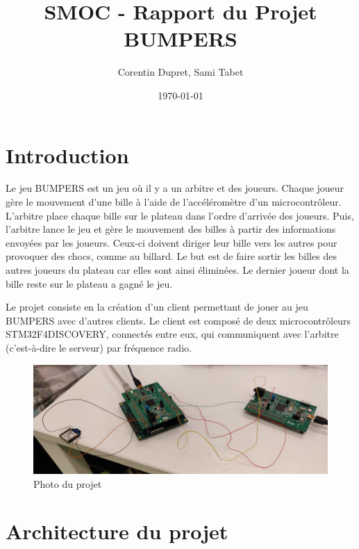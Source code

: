 \documentclass[12pt,french]{article}
\title{SMOC - Rapport du Projet BUMPERS}
\author{Corentin Dupret, Sami Tabet}
\date{\today}
\begin{document}
\maketitle

\newpage

\tableofcontents

\newpage

\section{Introduction}

Le jeu BUMPERS est un jeu où il y a un arbitre et des joueurs. Chaque joueur gère le mouvement d'une bille à l'aide de l'accéléromètre d'un microcontrôleur. L'arbitre place chaque bille sur le plateau dans l'ordre d'arrivée des joueurs. Puis, l'arbitre lance le jeu et gère le mouvement des billes à partir des informations envoyées par les joueurs. Ceux-ci doivent diriger leur bille vers les autres pour provoquer des chocs, comme au billard. Le but est de faire sortir les billes des autres joueurs du plateau car elles sont ainsi éliminées. Le dernier joueur dont la bille reste sur le plateau a gagné le jeu.

Le projet consiste en la création d'un client permettant de jouer au jeu BUMPERS avec d'autres clients. Le client est composé de deux microcontrôleurs STM32F4DISCOVERY, connectés entre eux, qui communiquent avec l'arbitre (c'est-à-dire le serveur) par fréquence radio.

\begin{figure}[h]
\centering
\includegraphics[width=\textwidth]{smoc_photo.jpg}
\caption{Photo du projet}
\label{fig:photo}
\end{figure}

\section{Architecture du projet}
\end{document}
